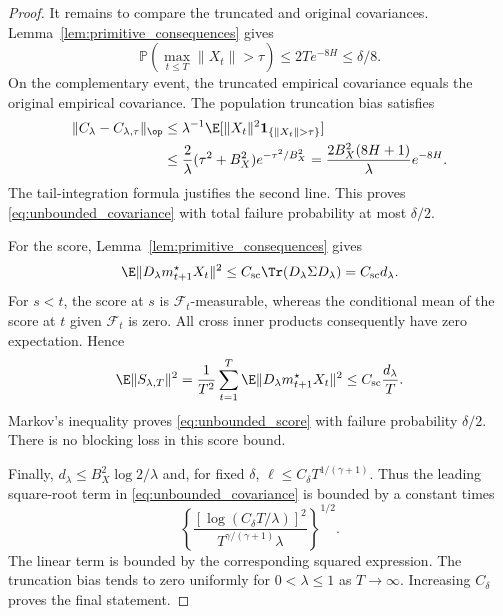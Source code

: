 \begin{proof}
It remains to compare the truncated and original covariances.
Lemma~\ref{lem:primitive_consequences} gives
\[
\mathbb P\!\left(\max_{t\leq T}\|X_t\|>\tau\right)
\leq2Te^{-8H}\leq\delta/8.
\]
On the complementary event, the truncated empirical covariance equals the
original empirical covariance. The population truncation bias satisfies
\[
\begin{aligned}
\|C_\lambda-C_{\lambda,\tau}\|_{\op}
&\leq\lambda^{-1}\E[\|X_t\|^2\mathbf1_{\{\|X_t\|>\tau\}}]\\
&\leq\frac{2}{\lambda}(\tau^2+B_X^2)e^{-\tau^2/B_X^2}
=\frac{2B_X^2(8H+1)}{\lambda}e^{-8H}.
\end{aligned}
\]
The tail-integration formula justifies the second line. This proves
\eqref{eq:unbounded_covariance} with total failure probability at most
$\delta/2$.

For the score, Lemma~\ref{lem:primitive_consequences} gives
\[
\E\|D_\lambda m^\star_{t+1}X_t\|^2
\leq C_{\rm sc}\Tr(D_\lambda\Sigma D_\lambda)
=C_{\rm sc}d_\lambda.
\]
For $s<t$, the score at $s$ is $\mathscr F_t$-measurable, whereas the
conditional mean of the score at $t$ given $\mathscr F_t$ is zero.
All cross inner products consequently have zero expectation. Hence
\[
\E\|S_{\lambda,T}\|^2
=\frac1{T^2}\sum_{t=1}^T
  \E\|D_\lambda m^\star_{t+1}X_t\|^2
\leq C_{\rm sc}\frac{d_\lambda}{T}.
\]
Markov's inequality proves \eqref{eq:unbounded_score} with failure
probability $\delta/2$. There is no blocking loss in this score bound.

Finally, $d_\lambda\leq B_X^2\log2/\lambda$ and, for fixed $\delta$,
$\ell\leq C_\delta T^{1/(\gamma+1)}$.
Thus the leading square-root term in \eqref{eq:unbounded_covariance} is
bounded by a constant times
\[
\left\{
\frac{[\log(C_\delta T/\lambda)]^2}
     {T^{\gamma/(\gamma+1)}\lambda}
\right\}^{1/2}.
\]
The linear term is bounded by the corresponding squared expression.
The truncation bias tends to zero uniformly for $0<\lambda\leq1$ as
$T\to\infty$. Increasing $C_\delta$ proves the final statement.
\end{proof}

